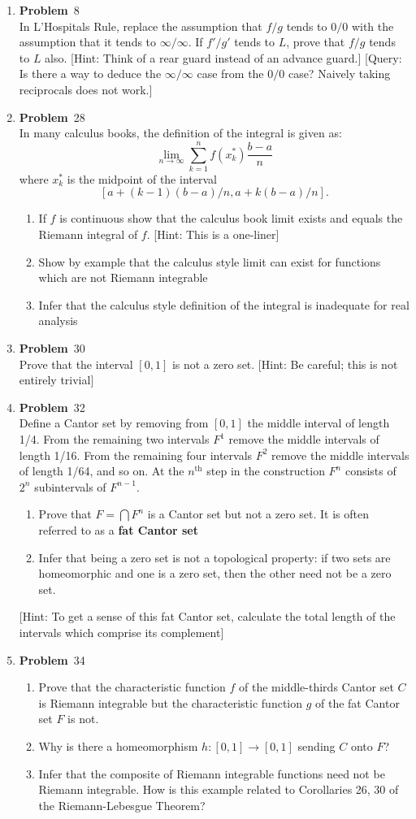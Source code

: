 \documentclass[12pt]{amsart}
\newcommand{\benu}{\begin{enumerate}}
\newcommand{\eenu}{\end{enumerate}}
\theoremstyle{definition}
\newcommand{\itep}{\item {\bfseries Problem}\ }
\begin{document}
\begin{enumerate}[series=p]
\newpage
\itep 8\\
In L'Hospitals Rule, replace the assumption that $f/g$ tends to $0/0$ with the assumption that it tends to $\infty/\infty$.  If $f'/g'$ tends to $L$, prove that $f/g$ tends to $L$ also.  [Hint: Think of a rear guard instead of an advance guard.] [Query: Is there a way to deduce the $\infty/\infty$ case from the $0/0$ case?  Naively taking reciprocals does not work.]


\newpage
\itep 28\\
In many calculus books, the definition of the integral is given as:
$$\lim\limits_{n \to \infty} \sum_{k=1}^{n}f(x^*_k) \frac{b-a}{n}$$
where $x^*_k$ is the midpoint of the interval
$$[a+(k-1)(b-a)/n, a + k(b-a)/n].$$
	\benu
		\item If $f$ is continuous show that the calculus book limit exists and equals the Riemann integral of $f$. [Hint: This is a one-liner]
		\item Show by example that the calculus style limit can exist for functions which are not Riemann integrable
		\item Infer that the calculus style definition of the integral is inadequate for real analysis
	\eenu


\newpage
\itep 30\\
Prove that the interval $[0,1]$ is not a zero set.  [Hint: Be careful; this is not entirely trivial]



\newpage
\itep 32\\
Define a Cantor set by removing from $[0,1]$ the middle interval of length 1/4.  From the remaining two intervals $F^1$ remove the middle intervals of length 1/16.  From the remaining four intervals $F^2$ remove the middle intervals of length 1/64, and so on.  At the $n^{\text{th}}$ step in the construction $F^n$ consists of $2^n$ subintervals of $F^{n-1}$.
	\benu
		\item Prove that $F = \bigcap F^n$ is a Cantor set but not a zero set.  It is often referred to as a \textbf{fat Cantor set}
		\item Infer that being a zero set is not a topological property: if two sets are homeomorphic and one is a zero set, then the other need not be a zero set.
	\eenu
	
[Hint: To get a sense of this fat Cantor set, calculate the total length of the intervals which comprise its complement]

\newpage
\itep 34\\
	\benu
		\item Prove that the characteristic function $f$ of the middle-thirds Cantor set $C$ is Riemann integrable but the characteristic function $g$ of the fat Cantor set $F$ is not.
		\item Why is there a homeomorphism $h: [0,1] \to [0,1]$ sending $C$ onto $F$?
		\item Infer that the composite of Riemann integrable functions need not be Riemann integrable.  How is this example related to Corollaries 26, 30 of the Riemann-Lebesgue Theorem?
	\eenu


\end{enumerate}
\end{document}

